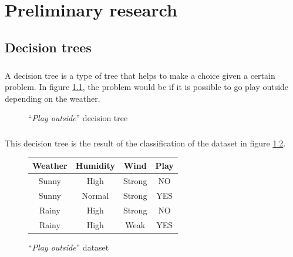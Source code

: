 \documentclass[12pt]{report}
\theoremstyle{definition}
\theoremstyle{definition}
\theoremstyle{definition}
\begin{document}
\chapter{Preliminary research}
\section{Decision trees}

\paragraph{} A decision tree is a type of tree that helps to make a choice given a certain problem. In figure
\ref{fig:tree}, the problem would be if it is possible to go play outside depending on the weather.

\begin{figure}[h]
    \centering
    \caption{``\textit{Play outside}'' decision tree}
    \label{fig:tree}
\end{figure}

\paragraph{} This decision tree is the result of the classification of the dataset in figure
\ref{fig:dataweather}.

\begin{figure}[h]
    \centering
    \begin{tabular}{||c c c c||} 
    \hline
    Weather & Humidity & Wind & Play\\[0.5ex]
    \hline\hline
    Sunny & High & Strong & NO\\ 
    Sunny & Normal & Strong & YES\\
    Rainy & High & Strong & NO\\
    Rainy & High & Weak & YES\\ 
    \hline
    \end{tabular}
    \caption{``\textit{Play outside}'' dataset}
    \label{fig:dataweather}
\end{figure}
\end{document}
